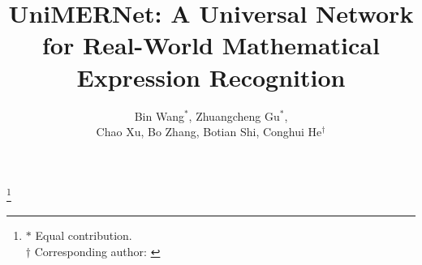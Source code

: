 \documentclass[runningheads]{llncs}
\begin{document}
\title{UniMERNet: A Universal Network for Real-World Mathematical Expression Recognition}



\author{
   Bin Wang$^{*}$, 
   Zhuangcheng Gu$^{*}$, \\
   Chao Xu,
   Bo Zhang,
   Botian Shi,
   Conghui He$^{\dag}$
}




\maketitle

\newcommand\blfootnote[1]{
    \begingroup
    \renewcommand\thefootnote{}\footnote{#1}
    \addtocounter{footnote}{-1}
    \endgroup
}
\blfootnote{
\noindent $*$ Equal contribution. \\
$\dag$ Corresponding author: \href{heconghui@pjlab.}{\color{black}{heconghui@pjlab.org.cn}}
}
\end{document}
